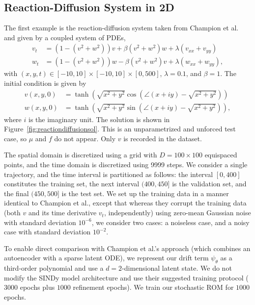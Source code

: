 \documentclass{article}
\begin{document}
	\subsection{Reaction-Diffusion System in 2D} \label{sec:reacdiffdetails}
	The first example is the reaction-diffusion system taken from Champion et al.~\cite{Champion_2019_Data_Driven_Coordinates} and given by a coupled system of PDEs,
	\begin{equation*}
		\begin{aligned}
			v_{t} & = (1 - (v^2 + w^2))v + \beta (v^2 + w^2)w + \lambda (v_{xx} + v_{yy}) \\
			w_{t} & = (1 - (v^2 + w^2))w - \beta (v^2 + w^2)v + \lambda (w_{xx} + w_{yy}),
		\end{aligned}
	\end{equation*}
	with $(x, y, t) \in [-10, 10] \times [-10, 10] \times [0, 500]$, $\lambda = 0.1$, and $\beta=1$. The initial condition is given by
	\begin{equation*}
		\begin{aligned}
			v(x,y,0) & = \tanh\left(\sqrt{x^2 + y^2}\cos\left(\angle(x+iy) - \sqrt{x^2 + y^2}\right)\right) \\
			w(x,y,0) & = \tanh\left(\sqrt{x^2 + y^2}\sin\left(\angle(x+iy) - \sqrt{x^2 + y^2}\right)\right),
		\end{aligned}
	\end{equation*}
	where $i$ is the imaginary unit. The solution is shown in Figure~\ref{fig:reactiondiffusionsol}. This is an unparametrized and unforced test case, so $\mu$ and $f$ do not appear. Only $v$ is recorded in the dataset.
	
	The spatial domain is discretized using a grid with $D=100 \times 100$ equispaced points, and the time domain is discretized using 9999 steps. We consider a single trajectory, and the time interval is partitioned as follows: the interval $[0, 400]$ constitutes the training set, the next interval $(400, 450]$ is the validation set, and the final $(450, 500]$ is the test set. We set up the training data in a manner identical to Champion et al., except that whereas they corrupt the training data (both $v$ and its time derivative $v_t$, independently) using zero-mean Gaussian noise with standard deviation $10^{-6}$, we consider two cases: a noiseless case, and a noisy case with standard deviation $10^{-2}$.
	
	To enable direct comparison with Champion et al.'s approach (which combines an autoencoder with a sparse latent ODE), we represent our drift term $\psi_{\theta}$ as a third-order polynomial and use a $d=2$-dimensional latent state. We do not modify the SINDy model architecture and use their suggested training protocol ($3000$ epochs plus $1000$ refinement epochs). We train our stochastic ROM for $1000$ epochs.
	
\end{document}
